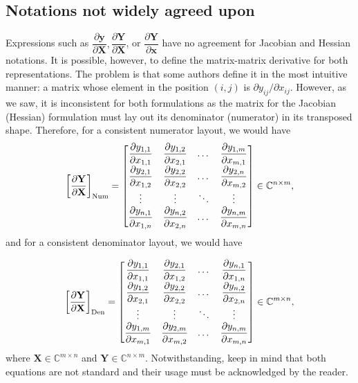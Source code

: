 \documentclass{article}
\begin{document}
\subsection{Notations not widely agreed upon}
Expressions such as \(\dfrac{\partial \mathbf{y}}{\partial \mathbf{X}}, \dfrac{\partial \mathbf{Y}}{\partial \mathbf{X}}\), or \(\dfrac{\partial \mathbf{Y}}{\partial \mathbf{x}}\) have no agreement for Jacobian and Hessian notations. It is possible, however, to define the matrix-matrix derivative for both representations. The problem is that some authors define it in the most intuitive manner: a matrix whose element in the position \((i,j)\) is \(\partial y_{ij}/\partial x_{ij}\). However, as we saw, it is inconsistent for both formulations as the matrix for the Jacobian (Hessian) formulation must lay out its denominator (numerator) in its transposed shape. Therefore, for a consistent numerator layout, we would have
\begin{align}
    \left[\frac{\partial \mathbf{Y}}{\partial\mathbf{X}}\right]_{\textnormal{Num}} = \begin{bmatrix}
        \dfrac{\partial y_{1,1}}{\partial x_{1,1}} & \dfrac{\partial y_{1,2}}{\partial x_{2,1}} & \dots & \dfrac{\partial y_{1,m}}{\partial x_{m,1}} \\
        \dfrac{\partial y_{2,1}}{\partial x_{1,2}} & \dfrac{\partial y_{2,2}}{\partial x_{2,2}} & \dots & \dfrac{\partial y_{2,n}}{\partial x_{m,2}} \\
        \vdots & \vdots & \ddots & \vdots \\
        \dfrac{\partial y_{n,1}}{\partial x_{1,n}} & \dfrac{\partial y_{n,2}}{\partial x_{2,n}} & \dots & \dfrac{\partial y_{n,m}}{\partial x_{m,n}} \\
    \end{bmatrix} \in \mathbb{C}^{n\times m},
\end{align}
and for a consistent denominator layout, we would have

\begin{align}
    \left[\frac{\partial \mathbf{Y}}{\partial\mathbf{X}}\right]_{\textnormal{Den}} = \begin{bmatrix}
        \dfrac{\partial y_{1,1}}{\partial x_{1,1}} & \dfrac{\partial y_{2,1}}{\partial x_{1,2}} & \dots & \dfrac{\partial y_{n,1}}{\partial x_{1,n}} \\
        \dfrac{\partial y_{1,2}}{\partial x_{2,1}} & \dfrac{\partial y_{2,2}}{\partial x_{2,2}} & \dots & \dfrac{\partial y_{n,2}}{\partial x_{2,n}} \\
        \vdots & \vdots & \ddots & \vdots \\
        \dfrac{\partial y_{1,m}}{\partial x_{m,1}} & \dfrac{\partial y_{2,m}}{\partial x_{m,2}} & \dots & \dfrac{\partial y_{n,m}}{\partial x_{m,n}} \\
    \end{bmatrix} \in \mathbb{C}^{m \times n},
\end{align}
where \(\mathbf{X}\in \mathbb{C}^{m\times n}\) and \(\mathbf{Y} \in \mathbb{C}^{n\times m}\). Notwithstanding, keep in mind that both equations are not standard and their usage must be acknowledged by the reader.
\end{document}
